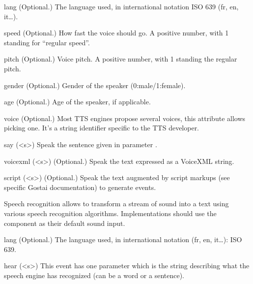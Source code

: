 \begin{urbiscriptapi}
\item[lang] (Optional.) The language used, in international notation ISO 639
  (fr, en, it\ldots).

\item[speed] (Optional.) How fast the voice should go.  A positive number,
  with 1 standing for ``regular speed''.

\item[pitch] (Optional.) Voice pitch.  A positive number, with 1 standing
  the regular pitch.

\item[gender] (Optional.) Gender of the speaker (0:male/1:female).

\item[age] (Optional.) Age of the speaker, if applicable.

\item[voice] (Optional.) Most TTS engines propose several voices, this
  attribute allows picking one. It's a string identifier specific to the TTS
  developer.

\item[say](<s>) Speak the sentence given in parameter .

\item[voicexml](<s>) (Optional.) Speak the text  expressed as a
  VoiceXML string.

\item[script](<s>) (Optional.) Speak the text  augmented by script
  markups (see specific Gostai documentation) to generate \urbi events.
\end{urbiscriptapi}



Speech recognition allows to transform a stream of sound into a text
using various speech recognition algorithms. Implementations
should use the  component as their default sound input.

\begin{urbiscriptapi}
\item[lang] (Optional.)  The language used, in international notation (fr,
  en, it…): ISO 639.
\item[hear](<s>) This event has one parameter which is the string describing
  what the speech engine has recognized (can be a word or a sentence).
\end{urbiscriptapi}


